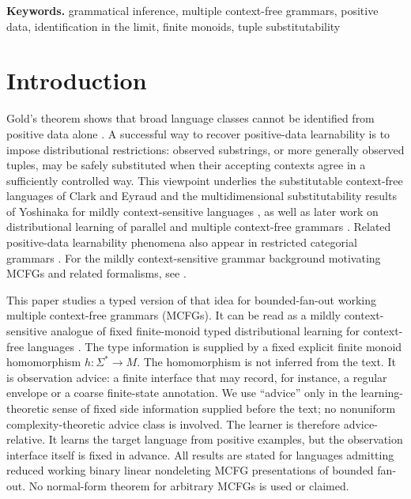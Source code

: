 \documentclass[11pt,a4paper]{article}
\theoremstyle{remark}
\providecommand{\keywords}[1]{\par\smallskip\noindent\textbf{Keywords. }#1\par}
\begin{document}
\keywords{grammatical inference, multiple context-free grammars, positive data,
identification in the limit, finite monoids, tuple substitutability}



\section{Introduction}
\label{sec:introduction}

Gold's theorem shows that broad language classes cannot be identified from
positive data alone \cite{Gold1967}.  A successful way to recover positive-data
learnability is to impose distributional restrictions: observed substrings, or
more generally observed tuples, may be safely substituted when their accepting
contexts agree in a sufficiently controlled way.  This viewpoint underlies the
substitutable context-free languages of Clark and Eyraud \cite{ClarkEyraud2007}
and the multidimensional substitutability results of Yoshinaka for mildly
context-sensitive languages \cite{Yoshinaka2008,Yoshinaka2009,Yoshinaka2011}, as
well as later work on distributional learning of parallel and multiple
context-free grammars \cite{ClarkYoshinaka2014,ClarkYoshinaka2016}.  Related
positive-data learnability phenomena also appear in restricted categorial
grammars \cite{Kanazawa1998}.  For the mildly context-sensitive grammar
background motivating MCFGs and related formalisms, see
\cite{Shieber1985,VijayShankerWeirJoshi1987,Weir1988,Kallmeyer2010}.

This paper studies a typed version of that idea for bounded-fan-out working
multiple context-free grammars (MCFGs).  It can be read as a mildly
context-sensitive analogue of fixed finite-monoid typed distributional learning
for context-free languages \cite{kuriyamaCFG}.  The type information is supplied
by a fixed explicit finite monoid homomorphism \(h:\Sigma^*\to M\).  The
homomorphism is not inferred from the text.  It is observation advice: a finite
interface that may record, for instance, a regular envelope or a coarse
finite-state annotation.  We use ``advice'' only in the learning-theoretic sense
of fixed side information supplied before the text; no nonuniform
complexity-theoretic advice class is involved.  The learner is therefore
advice-relative.  It learns the target language from positive examples, but the
observation interface itself is fixed in advance.  All results are stated for languages admitting reduced
working binary linear nondeleting MCFG presentations of bounded fan-out.  No
normal-form theorem for arbitrary MCFGs is used or claimed.
\end{document}

